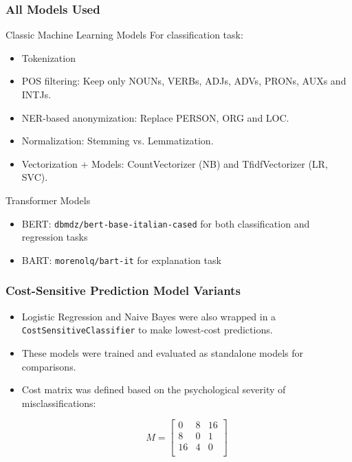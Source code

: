 \documentclass[aspectratio=169]{beamer}
\begin{document}
\begin{frame}
  \frametitle{All Models Used}

  \begin{block}{Classic Machine Learning Models}
    For classification task:
    \begin{itemize}
      \item Tokenization
      \item POS filtering: Keep only NOUNs, VERBs, ADJs, ADVs, PRONs, AUXs and INTJs.
      \item NER-based anonymization: Replace PERSON, ORG and LOC.
      \item Normalization: Stemming vs. Lemmatization.
      \item Vectorization + Models: CountVectorizer (NB) and TfidfVectorizer (LR, SVC).
    \end{itemize}
  \end{block}
  
    \pause
    \begin{block}{Transformer Models}
    \begin{itemize}
      \item BERT: \texttt{dbmdz/bert-base-italian-cased} for both classification and regression tasks
      \item BART: \texttt{morenolq/bart-it} for explanation task
    \end{itemize}
  \end{block}
\end{frame}

\begin{frame}
  \frametitle{Cost-Sensitive Prediction Model Variants}
  \begin{itemize}
    \item Logistic Regression and Naive Bayes were also wrapped in a \texttt{CostSensitiveClassifier} to make lowest-cost predictions.
    \item These models were trained and evaluated as standalone models for comparisons.
    \item Cost matrix was defined based on the psychological severity of misclassifications:

    \[
    M =
    \begin{bmatrix}
      0 & 8 & 16 \\
      8 & 0 & 1 \\
      16 & 4 & 0 \\
    \end{bmatrix}
    \]
  \end{itemize}
\end{frame}
\end{document}
